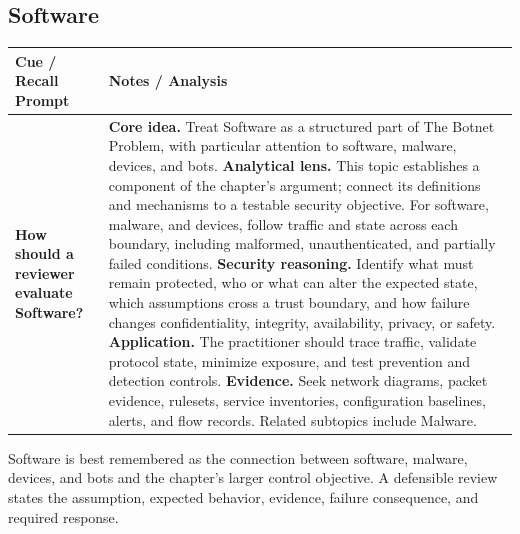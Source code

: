 \documentclass[11pt]{article}
\newcommand{\CornellHeader}{%
\rowcolor{Navy}\color{white}\bfseries Cue / Recall Prompt & \color{white}\bfseries Notes / Analysis\\\hline}
\newcommand{\CornellRow}[2]{%
\cellcolor{CueGray}\RaggedRight\textbf{#1} & \RaggedRight #2\\\hline}
\begin{document}
\subsection*{Software}
\begin{longtable}{>{\RaggedRight\arraybackslash}p{}|>{\RaggedRight\arraybackslash}p{}}
\CornellHeader
\CornellRow{How should a reviewer evaluate Software?}{\textbf{Core idea.} Treat Software as a structured part of The Botnet Problem, with particular attention to software, malware, devices, and bots. \textbf{Analytical lens.} This topic establishes a component of the chapter's argument; connect its definitions and mechanisms to a testable security objective. For software, malware, and devices, follow traffic and state across each boundary, including malformed, unauthenticated, and partially failed conditions. \textbf{Security reasoning.} Identify what must remain protected, who or what can alter the expected state, which assumptions cross a trust boundary, and how failure changes confidentiality, integrity, availability, privacy, or safety. \textbf{Application.} The practitioner should trace traffic, validate protocol state, minimize exposure, and test prevention and detection controls. \textbf{Evidence.} Seek network diagrams, packet evidence, rulesets, service inventories, configuration baselines, alerts, and flow records. Related subtopics include Malware.}
\end{longtable}
\begin{topicsummary}
Software is best remembered as the connection between software, malware, devices, and bots and the chapter's larger control objective. A defensible review states the assumption, expected behavior, evidence, failure consequence, and required response.
\end{topicsummary}
\end{document}
